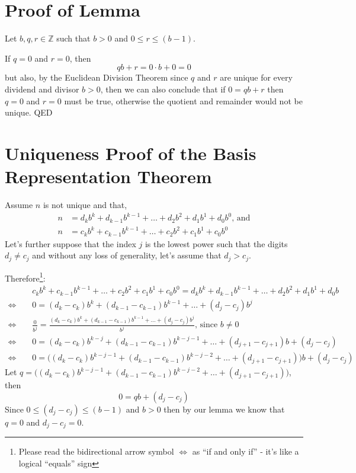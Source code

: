\documentclass{article}
\newenvironment{jprIn}{\begin{adjustwidth}{2em}{}}{\end{adjustwidth}}
\begin{document}
\section*{Proof of Lemma}
\begin{jprIn}
Let $b, q, r \in{} \mathbb{Z}$ such that $b>0$ and $0\le{}r\le{}(b-1)$.

If $q=0$ and $r=0$, then
\[qb+r=0\cdot{}b+0=0\]
but also, by the Euclidean Division Theorem since $q$ and $r$ are unique for every dividend and divisor $b>0$,
then we can also conclude that if $0=qb+r$ then $q=0$ and $r=0$ must be true, otherwise the quotient and remainder
would not be unique. QED
\end{jprIn}

\section*{Uniqueness Proof of the Basis Representation Theorem}

Assume $n$ is not unique and that,
\begin{align*}
n&=d_kb^k+d_{k-1}b^{k-1}+\dots+d_2b^2+d_1b^1+d_0b^0\text{, and}\\
n&=c_kb^k+c_{k-1}b^{k-1}+\dots+c_2b^2+c_1b^1+c_0b^0
\end{align*}
Let's further suppose that the index $j$ is the lowest power such that the digits $d_j\ne{}c_j$ and without any loss of generality,
let's assume that $d_j>c_j$.

Therefore\footnote{Please read the bidirectional arrow symbol $\Leftrightarrow$ as ``if and only if'' - it's like a logical ``equals'' sign}:
\begin{align*}
& c_kb^k+c_{k-1}b^{k-1}+\dots+c_2b^2+c_1b^1+c_0b^0=d_kb^k+d_{k-1}b^{k-1}+\dots+d_2b^2+d_1b^1+d_0b\\
\Leftrightarrow\;\;\;\;&0=(d_k-c_k)b^k+(d_{k-1}-c_{k-1})b^{k-1}+\dots+(d_j-c_j)b^j\\
\Leftrightarrow\;\;\;\;& \frac{0}{b^j}=\frac{(d_k-c_k)b^k+(d_{k-1}-c_{k-1})b^{k-1}+\dots+(d_j-c_j)b^j}{b^j}\text{, since }b\ne0\\
\Leftrightarrow\;\;\;\;& 0=(d_k-c_k)b^{k-j}+(d_{k-1}-c_{k-1})b^{k-j-1}+\dots+(d_{j+1}-c_{j+1})b+(d_j-c_j)\\
\Leftrightarrow\;\;\;\;& 0=\big((d_k-c_k)b^{k-j-1}+(d_{k-1}-c_{k-1})b^{k-j-2}+\dots+(d_{j+1}-c_{j+1})\big)b+(d_j-c_j)
\end{align*}
Let $q=\big((d_k-c_k)b^{k-j-1}+(d_{k-1}-c_{k-1})b^{k-j-2}+\dots+(d_{j+1}-c_{j+1})\big)$, then
\[0=qb+(d_j-c_j)\]
Since $0\le(d_j-c_j)\le(b-1)$ and $b>0$ then by our lemma we know that\\
$q=0$ and $d_j-c_j = 0$.
\end{document}
